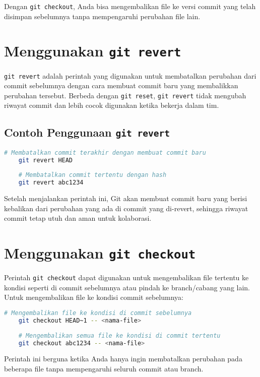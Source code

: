 Dengan \texttt{git checkout}, Anda bisa mengembalikan file ke versi commit yang telah disimpan sebelumnya tanpa mempengaruhi perubahan file lain.

\section{Menggunakan \texttt{git revert}}

\texttt{git revert} adalah perintah yang digunakan untuk membatalkan perubahan dari commit sebelumnya dengan cara membuat commit baru yang membalikkan perubahan tersebut. Berbeda dengan \texttt{git reset}, \texttt{git revert} tidak mengubah riwayat commit dan lebih cocok digunakan ketika bekerja dalam tim.

\subsection{Contoh Penggunaan \texttt{git revert}}

\begin{lstlisting}[language=bash]
	# Membatalkan commit terakhir dengan membuat commit baru
	git revert HEAD
	
	# Membatalkan commit tertentu dengan hash
	git revert abc1234
\end{lstlisting}

Setelah menjalankan perintah ini, Git akan membuat commit baru yang berisi kebalikan dari perubahan yang ada di commit yang di-revert, sehingga riwayat commit tetap utuh dan aman untuk kolaborasi.

\section{Menggunakan \texttt{git checkout}}

Perintah \texttt{git checkout} dapat digunakan untuk mengembalikan file tertentu ke kondisi seperti di commit sebelumnya atau pindah ke branch/cabang yang lain. Untuk mengembalikan file ke kondisi commit sebelumnya:

\begin{lstlisting}[language=bash]
	# Mengembalikan file ke kondisi di commit sebelumnya
	git checkout HEAD~1 -- <nama-file>
	
	# Mengembalikan semua file ke kondisi di commit tertentu
	git checkout abc1234 -- <nama-file>
\end{lstlisting}

Perintah ini berguna ketika Anda hanya ingin membatalkan perubahan pada beberapa file tanpa mempengaruhi seluruh commit atau branch.

